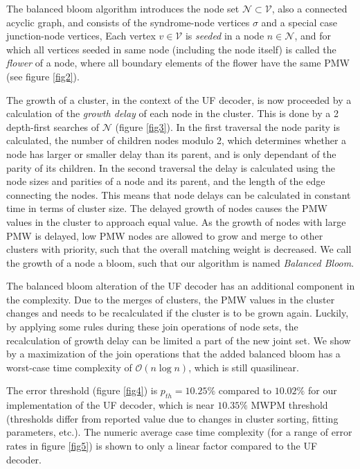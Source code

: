 \documentclass[10pt, a4paper, twoside, titlepage, usenames,dvipsnames]{report}
\begin{document}
The balanced bloom algorithm introduces the node set $\mathcal{N} \subset \mathcal{V}$, also a connected acyclic graph, and consists of the syndrome-node vertices $\sigma$ and a special case junction-node vertices, Each vertex $v \in \mathcal{V}$ is \emph{seeded} in a node $n\in \mathcal{N}$, and for which all vertices seeded in same node (including the node itself) is called the \emph{flower} of a node, where all boundary elements of the flower have the same PMW (see figure \ref{fig2}).

The growth of a cluster, in the context of the UF decoder, is now proceeded by a calculation of the \emph{growth delay} of each node in the cluster. This is done by a 2 depth-first searches of $\mathcal{N}$ (figure \ref{fig3}). In the first traversal the node parity is calculated, the number of children nodes modulo 2, which determines whether a node has larger or smaller delay than its parent, and is only dependant of the parity of its children. In the second traversal the delay is calculated using the node sizes and parities of a node and its parent, and the length of the edge connecting the nodes. This means that node delays can be calculated in constant time in terms of cluster size. The delayed growth of nodes causes the PMW values in the cluster to approach equal value. As the growth of nodes with large PMW is delayed, low PMW nodes are allowed to grow and merge to other clusters with priority, such that the overall matching weight is decreased. We call the growth of a node a bloom, such that our algorithm is named \emph{Balanced Bloom}.

The balanced bloom alteration of the UF decoder has an additional component in the complexity. Due to the merges of clusters, the PMW values in the cluster changes and needs to be recalculated if the cluster is to be grown again. Luckily, by applying some rules during these join operations of node sets, the recalculation of growth delay can be limited a part of the new joint set. We show by a maximization of the join operations that the added balanced bloom has a worst-case time complexity of $\mathcal{O}(n \log n)$, which is still quasilinear.

The error threshold (figure \ref{fig4}) is $p_{th} = 10.25\%$ compared to $10.02\%$ for our implementation of the UF decoder, which is near $10.35\%$ MWPM threshold (thresholds differ from reported value due to changes in cluster sorting, fitting parameters, etc.). The numeric average case time complexity (for a range of error rates in figure \ref{fig5}) is shown to only a linear factor compared to the UF decoder.\\
\end{document}
